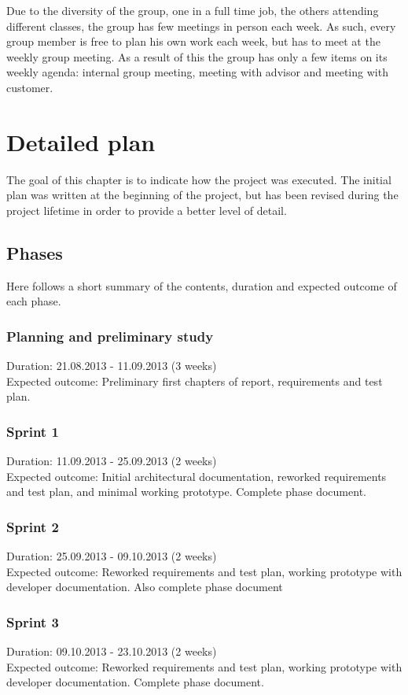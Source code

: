 \documentclass[11pt]{book}
\begin{document}
Due to the diversity of the group, one in a full time job, the others attending different classes, the group has few meetings in person each week. As such, every group member is free to plan his own work each week, but has to meet at the weekly group meeting. As a result of this the group has only a few items on its weekly agenda: internal group meeting, meeting with advisor and meeting with customer.

\section{Detailed plan}
The goal of this chapter is to indicate how the project was executed. The initial plan was written at the beginning of the project, but has been revised during the project lifetime in order to provide a better level of detail.

\subsection{Phases}\label{subsec:phases}
Here follows a short summary of the contents, duration and expected outcome of each phase.

\subsubsection{Planning and preliminary study}
Duration: 21.08.2013 - 11.09.2013 (3 weeks)\\
Expected outcome: Preliminary first chapters of report, requirements and test plan.

\subsubsection{Sprint 1}
Duration: 11.09.2013 - 25.09.2013 (2 weeks)\\
Expected outcome: Initial architectural documentation, reworked requirements and test plan, and minimal working prototype. Complete phase document.

\subsubsection{Sprint 2}
Duration: 25.09.2013 - 09.10.2013 (2 weeks)\\
Expected outcome: Reworked requirements and test plan, working prototype with developer documentation. Also complete phase document

\subsubsection{Sprint 3}
Duration: 09.10.2013 - 23.10.2013 (2 weeks)\\
Expected outcome: Reworked requirements and test plan, working prototype with developer documentation. Complete phase document.
\end{document}
